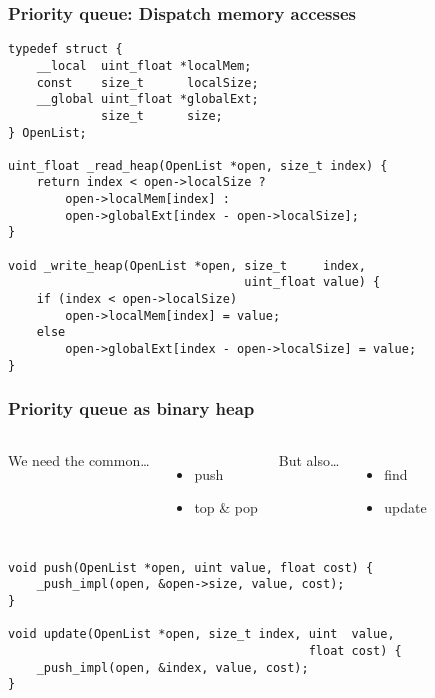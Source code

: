 \documentclass{beamer}
\begin{document}
\begin{frame}[fragile]
    \frametitle{Priority queue: Dispatch memory accesses}
    \begin{lstlisting}
typedef struct {
    __local  uint_float *localMem;
    const    size_t      localSize;
    __global uint_float *globalExt;
             size_t      size;
} OpenList;

uint_float _read_heap(OpenList *open, size_t index) {
    return index < open->localSize ?
        open->localMem[index] :
        open->globalExt[index - open->localSize];
}

void _write_heap(OpenList *open, size_t     index,
                                 uint_float value) {
    if (index < open->localSize)
        open->localMem[index] = value;
    else
        open->globalExt[index - open->localSize] = value;
}
    \end{lstlisting}
\end{frame}

\begin{frame}[fragile]
    \frametitle{Priority queue as binary heap}
    \begin{columns}[T]
        We need the common\dots
        \begin{itemize}
            \item push
            \item top \& pop
        \end{itemize}
    
        But also\dots
        \begin{itemize}
            \item find
            \item update
        \end{itemize}
    \end{columns}
    
    \vspace{1em}
    \begin{lstlisting}
void push(OpenList *open, uint value, float cost) {
    _push_impl(open, &open->size, value, cost);
}

void update(OpenList *open, size_t index, uint  value,
                                          float cost) {
    _push_impl(open, &index, value, cost);
}
    \end{lstlisting}
\end{frame}
\end{document}
